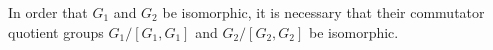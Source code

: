 In order that $G_1$ and $G_2$ be isomorphic, it is necessary that their commutator quotient groups $G_1/[G_1,G_1]$ and $G_2/[G_2,G_2]$ be isomorphic.
